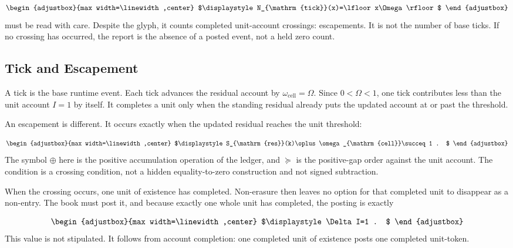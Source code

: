 \begin{equation*}
\begin{adjustbox}{max width=\linewidth,center}
$\displaystyle
N_{\mathrm{tick}}(x)=\lfloor x\Omega\rfloor
$
\end{adjustbox}
\end{equation*}
must be read with care. Despite the glyph, it counts completed unit-account crossings: escapements. It is not the number of base ticks. If no crossing has occurred, the report is the absence of a posted event, not a held zero count.

\subsection{Tick and Escapement}
A tick is the base runtime event. Each tick advances the residual account by \(\omega_{\mathrm{cell}}=\Omega\). Since \(0<\Omega<1\), one tick contributes less than the unit account \(I=1\) by itself. It completes a unit only when the standing residual already puts the updated account at or past the threshold.

An escapement is different. It occurs exactly when the updated residual reaches the unit threshold:

\begin{equation*}
\begin{adjustbox}{max width=\linewidth,center}
$\displaystyle
S_{\mathrm{res}}(k)\oplus\omega_{\mathrm{cell}}\succeq 1 .
$
\end{adjustbox}
\end{equation*}
The symbol \(\oplus\) here is the positive accumulation operation of the ledger, and \(\succeq\) is the positive-gap order against the unit account. The condition is a crossing condition, not a hidden equality-to-zero construction and not signed subtraction.

When the crossing occurs, one unit of existence has completed. Non-erasure then leaves no option for that completed unit to disappear as a non-entry. The book must post it, and because exactly one whole unit has completed, the posting is exactly

\begin{equation*}
\begin{adjustbox}{max width=\linewidth,center}
$\displaystyle
\Delta I=1 .
$
\end{adjustbox}
\end{equation*}
This value is not stipulated. It follows from account completion: one completed unit of existence posts one completed unit-token.

